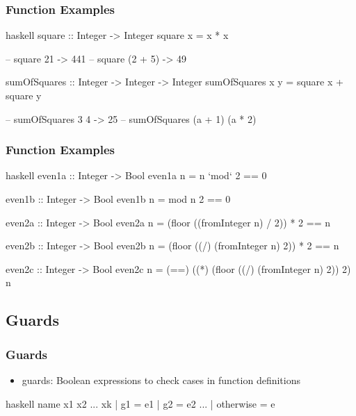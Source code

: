 \documentclass[dvipsnames]{beamer}
\theoremstyle{plain}
\begin{document}
\begin{frame}[fragile]
  \frametitle{Function Examples}

  \begin{exampleblock}{}
    \begin{pygments}{haskell}
square :: Integer -> Integer
square x = x * x

-- square 21 -> 441
-- square (2 + 5) -> 49

sumOfSquares :: Integer -> Integer -> Integer
sumOfSquares x y = square x + square y

-- sumOfSquares 3 4 -> 25
-- sumOfSquares (a + 1) (a * 2)
    \end{pygments}
  \end{exampleblock}
\end{frame}

\begin{frame}[fragile]
  \frametitle{Function Examples}

  \begin{exampleblock}{}
    \begin{pygments}{haskell}
even1a :: Integer -> Bool
even1a n = n `mod` 2 == 0

even1b :: Integer -> Bool
even1b n = mod n 2 == 0

even2a :: Integer -> Bool
even2a n = (floor ((fromInteger n) / 2)) * 2 == n

even2b :: Integer -> Bool
even2b n = (floor ((/) (fromInteger n) 2)) * 2 == n

even2c :: Integer -> Bool
even2c n =
    (==) ((*) (floor ((/) (fromInteger n) 2)) 2) n
    \end{pygments}
  \end{exampleblock}
\end{frame}

\subsection{Guards}

\begin{frame}[fragile]
  \frametitle{Guards}

  \begin{itemize}
    \item \alert{guards}: Boolean expressions to check cases
      in function definitions
  \end{itemize}

  \begin{block}{}
    \begin{pygments}{haskell}
name x1 x2 ... xk
  | g1        = e1
  | g2        = e2
    ...
  | otherwise = e
    \end{pygments}
  \end{block}
\end{frame}
\end{document}

